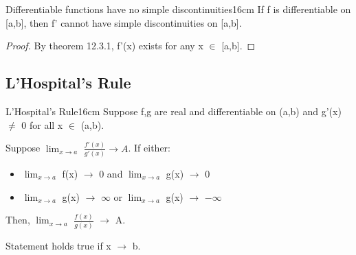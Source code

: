     \vspace{0.5cm}



    \begin{corollary}{Differentiable functions have no simple discontinuities}{16cm}
        If f is differentiable on [a,b], then f' cannot have simple discontinuities
        on [a,b].
    \end{corollary}

    \begin{proof}
        By {\color{red} theorem 12.3.1}, f'(x) exists for any x $\in$ [a,b].
    \end{proof}

    \newpage





\subsection{ L'Hospital's Rule }

    \begin{wtheorem}{L'Hospital's Rule}{16cm}
        Suppose f,g are real and differentiable on (a,b) and g'(x) $\not =$ 0
        for all x $\in$ (a,b).
        
        Suppose $\lim_{x \rightarrow a}$ $\frac{f'(x)}{g'(x)} \rightarrow A$.
        If either:
        
        \begin{itemize}[leftmargin=1cm, itemsep=0.1cm]
            \item                        
                $\lim_{x \rightarrow a}$ f(x) $\rightarrow$ 0 and
                $\lim_{x \rightarrow a}$ g(x) $\rightarrow$ 0

            \item
                $\lim_{x \rightarrow a}$ g(x) $\rightarrow$ $\infty$ or
                $\lim_{x \rightarrow a}$ g(x) $\rightarrow$ $-\infty$
        \end{itemize}

        Then, $\lim_{x \rightarrow a}$ $\frac{f(x)}{g(x)}$ $\rightarrow$ A.

        Statement holds true if x $\rightarrow$ b.
    \end{wtheorem}


